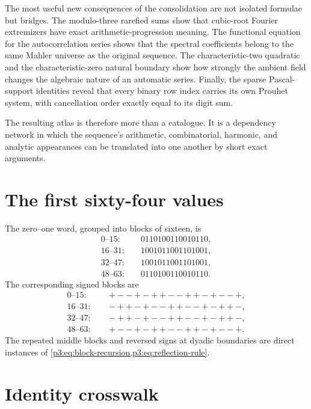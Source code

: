 \documentclass[11pt,oneside]{article}
\theoremstyle{definition}
\theoremstyle{remark}
\begin{document}
The most useful new consequences of the consolidation are not isolated
formulae but bridges.  The modulo-three rarefied sums show that cubic-root
Fourier extremizers have exact arithmetic-progression meaning.  The functional
equation for the autocorrelation series shows that the spectral coefficients
belong to the same Mahler universe as the original sequence.  The
characteristic-two quadratic and the characteristic-zero natural boundary
show how strongly the ambient field changes the algebraic nature of an
automatic series.  Finally, the sparse Pascal-support identities reveal that
every binary row index carries its own Prouhet system, with cancellation order
exactly equal to its digit sum.

The resulting atlas is therefore more than a catalogue.  It is a dependency
network in which the sequence's arithmetic, combinatorial, harmonic, and
analytic appearances can be translated into one another by short exact
arguments.

\appendix

\section{The first sixty-four values}

The zero--one word, grouped into blocks of sixteen, is
\begin{align*}
 0\text{--}15:&\quad 0110100110010110,\\
16\text{--}31:&\quad 1001011001101001,\\
32\text{--}47:&\quad 1001011001101001,\\
48\text{--}63:&\quad 0110100110010110.
\end{align*}
The corresponding signed blocks are
\begin{align*}
 0\text{--}15:&\quad +--+-++--++-+--+,\\
16\text{--}31:&\quad -++-+--++--+-++-,\\
32\text{--}47:&\quad -++-+--++--+-++-,\\
48\text{--}63:&\quad +--+-++--++-+--+.
\end{align*}
The repeated middle blocks and reversed signs at dyadic boundaries are direct
instances of \cref{p3:eq:block-recursion,p3:eq:reflection-rule}.

\section{Identity crosswalk}
\end{document}
